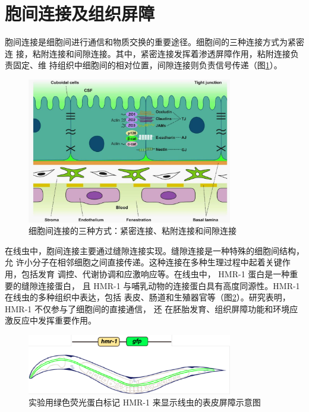 \section{胞间连接及组织屏障}

胞间连接是细胞间进行通信和物质交换的重要途径。细胞间的三种连接方式为紧密连 接，粘附连接和间隙连接。其中，紧密连接发挥着渗透屏障作用，粘附连接负责固定、维 持组织中细胞间的相对位置，间隙连接则负责信号传递（图\ref{fig:cell_connection}）。

\begin{figure}[H]
    \centering
    \includegraphics[width=0.8\textwidth]{img/three_cell_link_functions.jpg}
    \caption{细胞间连接的三种方式：紧密连接、粘附连接和间隙连接}
    \label{fig:cell_connection}
\end{figure}

在线虫中，胞间连接主要通过缝隙连接实现。缝隙连接是一种特殊的细胞间结构，允 许小分子在相邻细胞之间直接传递。这种连接在多种生理过程中起着关键作用，包括发育 调控、代谢协调和应激响应等。在线虫中， HMR-1 蛋白是一种重要的缝隙连接蛋白， 且 HMR-1 与哺乳动物的连接蛋白具有高度同源性。HMR-1 在线虫的多种组织中表达，包括 表皮、肠道和生殖器官等（图\ref{fig:HMR-1_protein}）。研究表明， HMR-1 不仅参与了细胞间的直接通信， 还 在胚胎发育、组织屏障功能和环境应激反应中发挥重要作用。

\begin{figure}[H]
    \centering
    \includegraphics[width=0.8\textwidth]{img/HMR_worm.png}
    \caption{实验用绿色荧光蛋白标记 HMR-1 来显示线虫的表皮屏障示意图}
    \label{fig:HMR-1_protein}
\end{figure}

